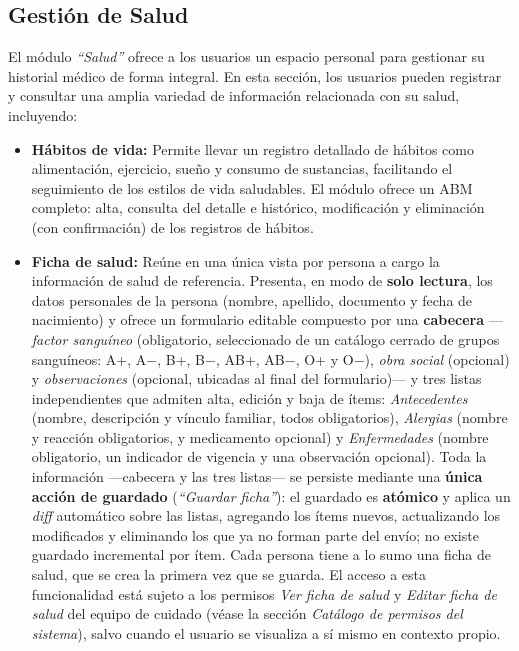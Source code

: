 \documentclass[a4paper,12pt]{article}
\begin{document}
    \subsection{Gestión de Salud}
    \par El módulo \textit{``Salud''} ofrece a los usuarios un espacio personal para gestionar su historial médico de forma integral. En esta sección, los usuarios pueden registrar y consultar una amplia variedad de información relacionada con su salud, incluyendo:
    \begin{itemize}
        \item \textbf{Hábitos de vida:} Permite llevar un registro detallado de hábitos como alimentación, ejercicio, sueño y consumo de sustancias, facilitando el seguimiento de los estilos de vida saludables. El módulo ofrece un ABM completo: alta, consulta del detalle e histórico, modificación y eliminación (con confirmación) de los registros de hábitos.
        \item \textbf{Ficha de salud:} Reúne en una única vista por persona a cargo la información de salud de referencia. Presenta, en modo de \textbf{solo lectura}, los datos personales de la persona (nombre, apellido, documento y fecha de nacimiento) y ofrece un formulario editable compuesto por una \textbf{cabecera} —\textit{factor sanguíneo} (obligatorio, seleccionado de un catálogo cerrado de grupos sanguíneos: A+, A$-$, B+, B$-$, AB+, AB$-$, O+ y O$-$), \textit{obra social} (opcional) y \textit{observaciones} (opcional, ubicadas al final del formulario)— y tres listas independientes que admiten alta, edición y baja de ítems: \textit{Antecedentes} (nombre, descripción y vínculo familiar, todos obligatorios), \textit{Alergias} (nombre y reacción obligatorios, y medicamento opcional) y \textit{Enfermedades} (nombre obligatorio, un indicador de vigencia y una observación opcional). Toda la información —cabecera y las tres listas— se persiste mediante una \textbf{única acción de guardado} (\textit{``Guardar ficha''}): el guardado es \textbf{atómico} y aplica un \textit{diff} automático sobre las listas, agregando los ítems nuevos, actualizando los modificados y eliminando los que ya no forman parte del envío; no existe guardado incremental por ítem. Cada persona tiene a lo sumo una ficha de salud, que se crea la primera vez que se guarda. El acceso a esta funcionalidad está sujeto a los permisos \textit{Ver ficha de salud} y \textit{Editar ficha de salud} del equipo de cuidado (véase la sección \textit{Catálogo de permisos del sistema}), salvo cuando el usuario se visualiza a sí mismo en contexto propio.

\end{itemize}
\end{document}
